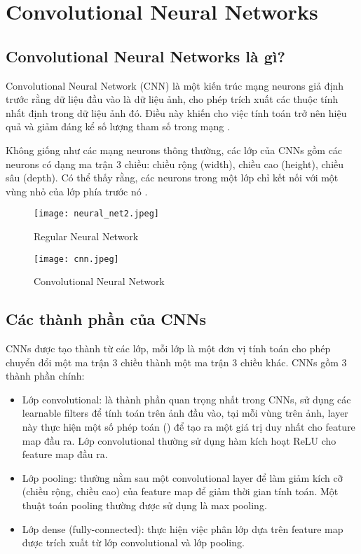 \documentclass[../thesis.tex]{subfiles}
\begin{document}
\section{Convolutional Neural Networks}

\subsection{Convolutional Neural Networks là gì?}

Convolutional Neural Network (CNN) là một kiến trúc mạng neurons giả định trước rằng dữ liệu đầu vào là dữ liệu ảnh, cho phép trích xuất các thuộc tính nhất định trong dữ liệu ảnh đó. Điều này khiến cho việc tính toán trở nên hiệu quả và giảm đáng kể số lượng tham số trong mạng \cite{cs231n}.

Không giống như các mạng neurons thông thường, các lớp của CNNs gồm các neurons có dạng ma trận 3 chiều: chiều rộng (width), chiều cao (height), chiều sâu (depth). Có thể thấy rằng, các neurons trong một lớp chỉ kết nối với một vùng nhỏ của lớp phía trước nó \cite{cs231n}.
\begin{figure}[!htb]
	\begin{minipage}{0.48\textwidth}
		\centering
		\texttt{[image: neural\_net2.jpeg]}
		\caption{Regular Neural Network}\label{Fig:NN}
	\end{minipage}\hfill
	\begin {minipage}{0.48\textwidth}
		\centering
		\texttt{[image: cnn.jpeg]}
		\caption{Convolutional Neural Network}\label{Fig:CNN}
	\end{minipage}
\end{figure}

\subsection{Các thành phần của CNNs}

CNNs được tạo thành từ các lớp, mỗi lớp là một đơn vị tính toán cho phép chuyển đổi một ma trận 3 chiều thành một ma trận 3 chiều khác. CNNs gồm 3 thành phần chính\cite{tfcnn}: 

\begin{itemize}
  \item Lớp convolutional: là thành phần quan trọng nhất trong CNNs, sử dụng các learnable filters để tính toán trên ảnh đầu vào, tại mỗi vùng trên ảnh, layer này thực hiện một số phép toán () để tạo ra một giá trị duy nhất cho feature map đầu ra. Lớp convolutional thường sử dụng hàm kích hoạt ReLU cho feature map đầu ra.
  \item Lớp pooling: thường nằm sau một convolutional layer để làm giảm kích cỡ (chiều rộng, chiều cao) của feature map để giảm thời gian tính toán. Một thuật toán pooling thường được sử dụng là max pooling.
  \item Lớp dense (fully-connected): thực hiện việc phân lớp dựa trên feature map được trích xuất từ lớp convolutional và lớp pooling.
\end{itemize}
\end{document}
